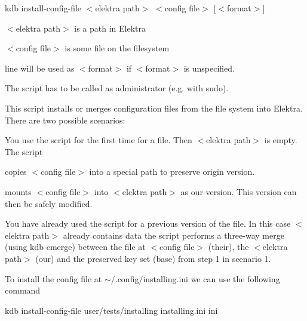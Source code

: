 {\ttfamily kdb install-\/config-\/file $<$elektra path$>$ $<$config file$>$ \mbox{[}$<$format$>$\mbox{]}}


\begin{DoxyItemize}
\item {\ttfamily $<$elektra path$>$} is a path in Elektra
\item {\ttfamily $<$config file$>$} is some file on the filesystem
\end{DoxyItemize}

{\ttfamily line} will be used as {\ttfamily $<$format$>$} if {\ttfamily $<$format$>$} is unspecified.

The script has to be called as administrator (e.\+g. with {\ttfamily sudo}).

This script installs or merges configuration files from the file system into Elektra. There are two possible scenarios\+:


\begin{DoxyEnumerate}
\item You use the script for the first time for a file. Then {\ttfamily $<$elektra path$>$} is empty. The script
\begin{DoxyEnumerate}
\item copies {\ttfamily $<$config file$>$} into a special path to preserve origin version.
\item mounts {\ttfamily $<$config file$>$} into {\ttfamily $<$elektra path$>$} as our version. This version can then be safely modified.
\end{DoxyEnumerate}
\item You have already used the script for a previous version of the file. In this case {\ttfamily $<$elektra path$>$} already contains data the script performs a three-\/way merge (using {\ttfamily kdb cmerge}) between the file at {\ttfamily $<$config file$>$} (their), the {\ttfamily $<$elektra path$>$} (our) and the preserved key set (base) from step 1 in scenario 1.
\end{DoxyEnumerate}

To install the config file at {\ttfamily $\sim$/.config/installing.\+ini} we can use the following command

{\ttfamily kdb install-\/config-\/file user/tests/installing installing.\+ini ini} 